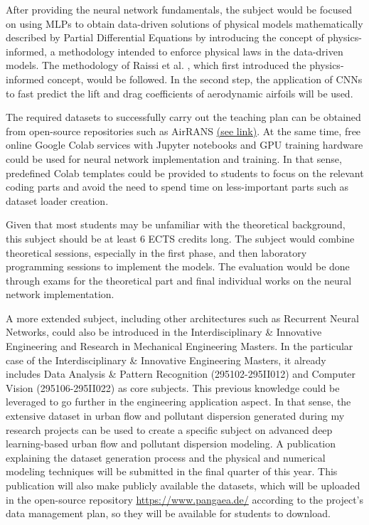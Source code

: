\documentclass{article}
\begin{document}
After providing the neural network fundamentals, the subject would be focused on using MLPs to obtain data-driven solutions of physical models mathematically described by Partial Differential Equations by introducing the concept of physics-informed, a methodology intended to enforce physical laws in the data-driven models. The methodology of Raissi et al. \cite{RAI17}, which first introduced the physics-informed concept, would be followed. In the second step, the application of CNNs to fast predict the lift and drag coefficients of aerodynamic airfoils will be used. 

The required datasets to successfully carry out the teaching plan can be obtained from open-source repositories such as AirRANS \href{https://airfrans.readthedocs.io/en/latest/index.html}{(see link)}. At the same time, free online Google Colab services with Jupyter notebooks and GPU training hardware could be used for neural network implementation and training. In that sense, predefined Colab templates could be provided to students to focus on the relevant coding parts and avoid the need to spend time on less-important parts such as dataset loader creation. 

Given that most students may be unfamiliar with the theoretical background, this subject should be at least 6 ECTS credits long. The subject would combine theoretical sessions, especially in the first phase, and then laboratory programming sessions to implement the models. The evaluation would be done through exams for the theoretical part and final individual works on the neural network implementation. 

A more extended subject, including other architectures such as Recurrent Neural Networks, could also be introduced in the Interdisciplinary \& Innovative Engineering and Research in Mechanical Engineering Masters. In the particular case of the Interdisciplinary \& Innovative Engineering Masters, it already includes Data Analysis \& Pattern Recognition (295102-295II012) and Computer Vision (295106-295II022) as core subjects. This previous knowledge could be leveraged to go further in the engineering application aspect. In that sense, the extensive dataset in urban flow and pollutant dispersion generated during my research projects can be used to create a specific subject on advanced deep learning-based urban flow and pollutant dispersion modeling. A publication explaining the dataset generation process and the physical and numerical modeling techniques will be submitted in the final quarter of this year. This publication will also make publicly available the datasets, which will be uploaded in the open-source repository \href{https://www.pangaea.de/}{https://www.pangaea.de/} according to the project's data management plan, so they will be available for students to download. 
\end{document}
